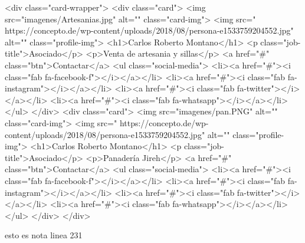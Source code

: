 <div class="card-wrapper">
  <div class="card">
    <img src="imagenes/Artesanias.jpg" alt="" class="card-img">
    <img src=" https://concepto.de/wp-content/uploads/2018/08/persona-e1533759204552.jpg" alt="" class="profile-img">
    <h1>Carlos Roberto Montano</h1>
    <p class="job-title">Asociado</p>
    <p>Venta de artesania y sillas</p>
    <a href="#" class="btn">Contactar</a>
    <ul class="social-media">
      <li><a href="#"><i class="fab fa-facebook-f"></i></a></li> 
      <li><a href="#"><i class="fab fa-instagram"></i></a></li>   
      <li><a href="#"><i class="fab fa-twitter"></i></a></li>   
      <li><a href="#"><i class="fab fa-whatsapp"></i></a></li>     
    </ul>
  </div>
<div class="card">
    <img src="imagenes/pan.PNG" alt="" class="card-img">
    <img src=" https://concepto.de/wp-content/uploads/2018/08/persona-e1533759204552.jpg" alt="" class="profile-img">
    <h1>Carlos Roberto Montano</h1>
    <p class="job-title">Asociado</p>
    <p>Panadería Jireh</p>
    <a href="#" class="btn">Contactar</a>
    <ul class="social-media">
      <li><a href="#"><i class="fab fa-facebook-f"></i></a></li> 
      <li><a href="#"><i class="fab fa-instagram"></i></a></li>   
      <li><a href="#"><i class="fab fa-twitter"></i></a></li>   
      <li><a href="#"><i class="fab fa-whatsapp"></i></a></li>     
    </ul>
  </div>
</div>

esto es nota linea 231